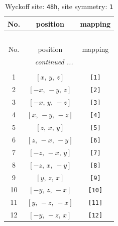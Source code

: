 \documentclass[fleqn,8pt]{jsarticle}
\begin{document}
\begin{longtable}{ccc}
\caption{Wyckoff site: {\tt 48h}, site symmetry: {\tt 1}}
 \\
 \hline \hline
No. & position & mapping \\ \hline \endfirsthead

\multicolumn{2}{l}{\tablename\ \thetable{}} \\
 \hline \hline
No. & position & mapping \\ \hline \endhead

 \hline \hline
\multicolumn{2}{r}{\footnotesize\it continued ...} \\ \endfoot

 \hline \hline
\multicolumn{2}{r}{} \\ \endlastfoot

1 & $\left[ x,\, y,\, z \right]$ & {\tt [1]} \\ \hline
2 & $\left[ - x,\, - y,\, z \right]$ & {\tt [2]} \\ \hline
3 & $\left[ - x,\, y,\, - z \right]$ & {\tt [3]} \\ \hline
4 & $\left[ x,\, - y,\, - z \right]$ & {\tt [4]} \\ \hline
5 & $\left[ z,\, x,\, y \right]$ & {\tt [5]} \\ \hline
6 & $\left[ z,\, - x,\, - y \right]$ & {\tt [6]} \\ \hline
7 & $\left[ - z,\, - x,\, y \right]$ & {\tt [7]} \\ \hline
8 & $\left[ - z,\, x,\, - y \right]$ & {\tt [8]} \\ \hline
9 & $\left[ y,\, z,\, x \right]$ & {\tt [9]} \\ \hline
10 & $\left[ - y,\, z,\, - x \right]$ & {\tt [10]} \\ \hline
11 & $\left[ y,\, - z,\, - x \right]$ & {\tt [11]} \\ \hline
12 & $\left[ - y,\, - z,\, x \right]$ & {\tt [12]} \\
\end{longtable}
\end{document}
